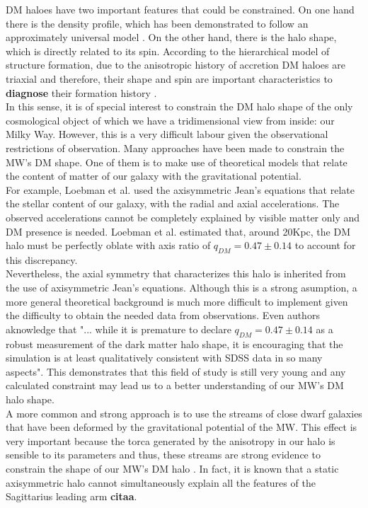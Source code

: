 DM haloes have two important features that could be constrained. 
On one hand there is the density profile, which has been demonstrated to follow an approximately universal model \cite{Navarro et al. 2010}. 
On the other hand, there is the halo shape, which is directly related to its spin. 
According to the hierarchical model of structure formation, due to the anisotropic history of accretion DM haloes are triaxial and therefore, their shape and spin are important characteristics to \textbf{diagnose} their formation history \cite{Bardeen et al. 1986}.\\

In this sense, it is of special interest to constrain the DM halo shape of the only cosmological object of which we have a tridimensional view from inside: our Milky Way. However, this is a very difficult labour given the observational restrictions of observation. Many approaches have been made to constrain the MW's DM shape. One of them is to make use of theoretical models that relate the content of matter of our galaxy with the gravitational potential.\\

For example, Loebman et al. \cite{Loebman et al 2012} used the axisymmetric Jean's equations \cite{Jean 2015} that relate the stellar content of our galaxy, with the radial and axial accelerations. 
The observed accelerations cannot be completely explained by visible matter only and DM presence is needed. Loebman et al. estimated that, around 20Kpc, the DM halo must be perfectly oblate with axis ratio of $q_{DM}=0.47 \pm 0.14$ to account for this discrepancy.\\

Nevertheless, the axial symmetry that characterizes this halo is inherited from the use of axisymmetric Jean's equations. 
Although this is a strong asumption, a more general theoretical background is much more difficult to implement given the difficulty to obtain the needed data from observations. 
Even authors aknowledge that "... while it is premature to declare $q_{DM}=0.47 \pm 0.14$ as a robust measurement of the dark matter halo shape, it is encouraging that the simulation is at least qualitatively consistent with SDSS data in so many aspects".
This demonstrates that this field of study is still very young and any calculated constraint may lead us to a better understanding of our MW's DM halo shape.\\

A more common and strong approach is to use the streams of close dwarf galaxies that have been deformed by the gravitational potential of the MW. 
This effect is very important because the torca generated by the anisotropy in our halo is sensible to its parameters and thus, these streams are strong evidence to constrain the shape of our MW's DM halo \cite{See Law-Majewski references}. 
In fact, it is known that a static axisymmetric halo cannot simultaneously explain all the features of the Sagittarius leading arm \textbf{citaa}. \\


